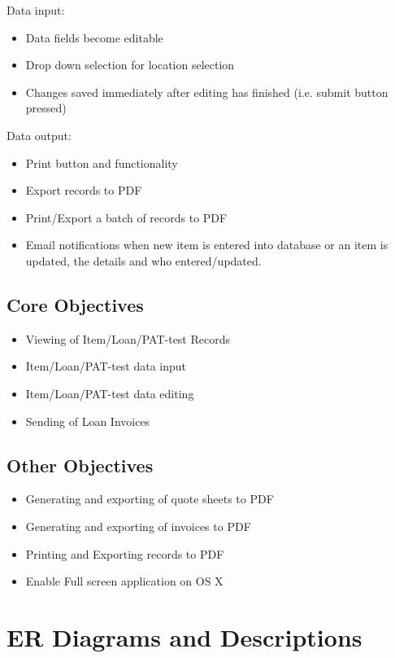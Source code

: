 \noindent Data input:
\begin{itemize}
    \item Data fields become editable
    \item Drop down selection for location selection
    \item Changes saved immediately after editing has finished (i.e. submit button pressed)
\end{itemize}

\noindent Data output:
\begin{itemize}
    \item Print button and functionality
    \item Export records to PDF
    \item Print/Export a batch of records to PDF
    \item Email notifications when new item is entered into database or an item is updated, the details and who entered/updated.
\end{itemize}


\subsection{Core Objectives}

\begin{itemize}
    \item Viewing of Item/Loan/PAT-test Records
    \item Item/Loan/PAT-test data input
    \item Item/Loan/PAT-test data editing
    \item Sending of Loan Invoices
\end{itemize}

\subsection{Other Objectives}

\begin{itemize}
    \item Generating and exporting of quote sheets to PDF
    \item Generating and exporting of invoices to PDF
    \item Printing and Exporting records to PDF
    \item Enable Full screen application on OS X
\end{itemize}

\section{ER Diagrams and Descriptions}

